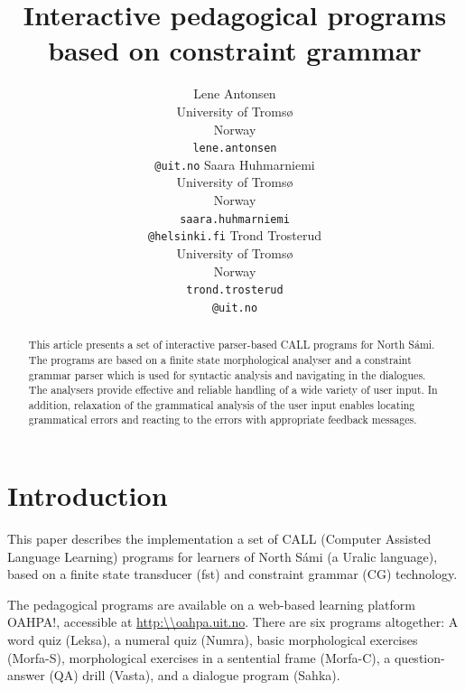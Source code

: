 \documentclass[11pt]{article}
\begin{document}
\title{Interactive pedagogical programs based on constraint grammar}


\author{Lene Antonsen\\
  University of Tromsø\\
  Norway\\
  {\tt lene.antonsen}\\{\tt @uit.no}  \And
  Saara Huhmarniemi\\
  University of Tromsø\\
  Norway\\
  {\tt saara.huhmarniemi}\\{\tt @helsinki.fi}  \And
  Trond Trosterud\\
  University of Tromsø\\
  Norway\\
  {\tt trond.trosterud}\\{\tt @uit.no}}

 
\maketitle

\begin{abstract}
This article presents a set of interactive parser-based CALL programs for North Sámi. The programs are based on a finite state morphological analyser and  a constraint grammar parser which is used for syntactic analysis and navigating in the dialogues. The analysers provide effective and reliable handling of a wide variety of user input. In addition, relaxation of the grammatical analysis of the user input enables locating grammatical errors and reacting to the errors with appropriate feedback messages. 
\end{abstract}

\section{Introduction}
This paper describes the implementation a set of CALL (Computer Assisted Language Learning) programs for learners of North Sámi (a Uralic language), based on a finite state transducer (fst) and constraint grammar (CG) technology. 

The pedagogical programs are available on a web-based learning platform OAHPA!, accessible at \url{http:\\oahpa.uit.no}. There are six programs altogether: A word quiz (Leksa), a numeral quiz (Numra), basic morphological exercises (Morfa-S), morphological exercises in a sentential frame (Morfa-C), a question-answer (QA) drill (Vasta), and a dialogue program (Sahka).
\end{document}
